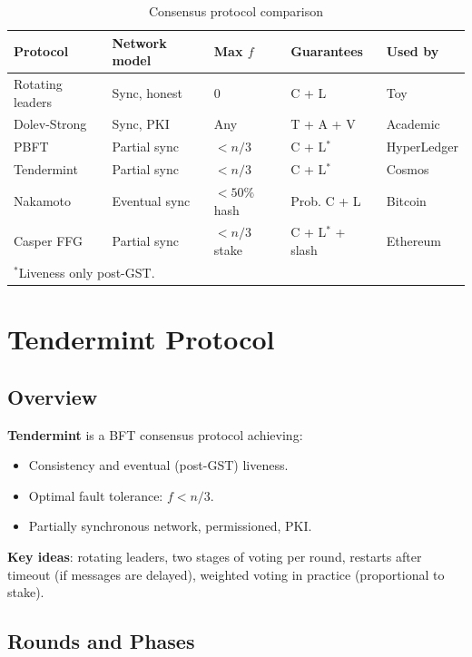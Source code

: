 \documentclass[12pt,a4paper,openany]{book}
\theoremstyle{definition}
\theoremstyle{plain}
\theoremstyle{remark}
\begin{document}
\begin{table}[h]
\centering
\caption{Consensus protocol comparison}
\begin{tabular}{p{2.8cm}p{2.8cm}p{2cm}p{3.5cm}p{2cm}}
\toprule
\textbf{Protocol} & \textbf{Network model} & \textbf{Max $f$} & \textbf{Guarantees} & \textbf{Used by} \\
\midrule
Rotating leaders & Sync, honest & 0 & C + L & Toy \\
Dolev-Strong & Sync, PKI & Any & T + A + V & Academic \\
PBFT & Partial sync & $<n/3$ & C + L$^*$ & HyperLedger \\
Tendermint & Partial sync & $<n/3$ & C + L$^*$ & Cosmos \\
Nakamoto & Eventual sync & $<50\%$ hash & Prob. C + L & Bitcoin \\
Casper FFG & Partial sync & $<n/3$ stake & C + L$^*$ + slash & Ethereum \\
\bottomrule
\multicolumn{5}{l}{\footnotesize $^*$Liveness only post-GST.}
\end{tabular}
\end{table}


\chapter{Tendermint Protocol}
\label{chap:tendermint}

\section{Overview}

\textbf{Tendermint} is a BFT consensus protocol achieving:
\begin{itemize}
  \item Consistency and eventual (post-GST) liveness.
  \item Optimal fault tolerance: $f < n/3$.
  \item Partially synchronous network, permissioned, PKI.
\end{itemize}

\textbf{Key ideas}: rotating leaders, two stages of voting per round,
restarts after timeout (if messages are delayed), weighted voting in
practice (proportional to stake).

\section{Rounds and Phases}
\end{document}
